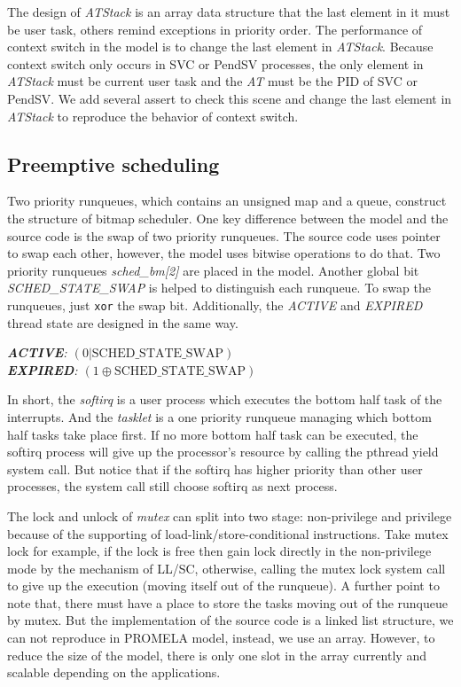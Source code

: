 The design of \textit{ATStack} is an array data structure that the last element in it must be user task, others remind exceptions in priority order. The performance of context switch in the model is to change the last element in \textit{ATStack}. Because context switch only occurs in SVC or PendSV processes, the only element in \textit{ATStack} must be current user task and the \textit{AT} must be the PID of SVC or PendSV. We add several assert to check this scene and change the last element in \textit{ATStack} to reproduce the behavior of context switch.

\subsection{Preemptive scheduling}
Two priority runqueues, which contains an unsigned map and a queue, construct the structure of bitmap scheduler. One key difference between the model and the source code is the swap of two priority runqueues. The source code uses pointer to swap each other, however, the model uses bitwise operations to do that. Two priority runqueues \textit{sched\_bm[2]} are placed in the model. Another global bit \textit{SCHED\_STATE\_SWAP} is helped to distinguish each runqueue. To swap the runqueues, just \texttt{xor} the swap bit. Additionally, the \textit{ACTIVE} and \textit{EXPIRED} thread state are designed in the same way.

{\medbreak\indent\textit{\textbf{ACTIVE}: $(0 | \text{SCHED\_STATE\_SWAP})$}}
{\\\indent\textit{\textbf{EXPIRED}: $(1 \oplus \text{SCHED\_STATE\_SWAP})$}}
\medbreak

In short, the \textit{softirq} is a user process which executes the bottom half task of the interrupts. And the \textit{tasklet} is a one priority runqueue managing which bottom half tasks take place first. If no more bottom half task can be executed, the softirq process will give up the processor's resource by calling the pthread yield system call. But notice that if the softirq has higher priority than other user processes, the system call still choose softirq as next process.

The lock and unlock of \textit{mutex} can split into two stage: non-privilege and privilege because of the supporting of load-link/store-conditional instructions. Take mutex lock for example, if the lock is free then gain lock directly in the non-privilege mode by the mechanism of LL/SC, otherwise, calling the mutex lock system call to give up the execution (moving itself out of the runqueue). A further point to note that, there must have a place to store the tasks moving out of the runqueue by mutex. But the implementation of the source code is a linked list structure, we can not reproduce in PROMELA model, instead, we use an array. However, to reduce the size of the model, there is only one slot in the array currently and scalable depending on the applications.

